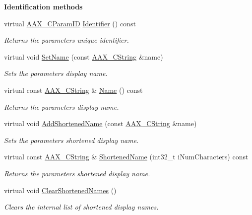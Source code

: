 \begin{Indent}{\bf Identification methods}\par
\begin{DoxyCompactItemize}
\item 
virtual \hyperlink{a00149_a1440c756fe5cb158b78193b2fc1780d1}{A\+A\+X\+\_\+\+C\+Param\+I\+D} \hyperlink{a00040_a446167294c50fd5761fcd41fa493f753}{Identifier} () const 
\begin{DoxyCompactList}\small\item\em Returns the parameter\textquotesingle{}s unique identifier. \end{DoxyCompactList}\item 
virtual void \hyperlink{a00040_a4d64be6c9e51840cde82e0521c98a8ac}{Set\+Name} (const \hyperlink{a00042}{A\+A\+X\+\_\+\+C\+String} \&name)
\begin{DoxyCompactList}\small\item\em Sets the parameter\textquotesingle{}s display name. \end{DoxyCompactList}\item 
virtual const \hyperlink{a00042}{A\+A\+X\+\_\+\+C\+String} \& \hyperlink{a00040_a497700bc60fbd19ad3651f9adfc30166}{Name} () const 
\begin{DoxyCompactList}\small\item\em Returns the parameter\textquotesingle{}s display name. \end{DoxyCompactList}\item 
virtual void \hyperlink{a00040_a1a23881e50534a7ec0634784b2af96a6}{Add\+Shortened\+Name} (const \hyperlink{a00042}{A\+A\+X\+\_\+\+C\+String} \&name)
\begin{DoxyCompactList}\small\item\em Sets the parameter\textquotesingle{}s shortened display name. \end{DoxyCompactList}\item 
virtual const \hyperlink{a00042}{A\+A\+X\+\_\+\+C\+String} \& \hyperlink{a00040_a718c18af4d690a8a23a6893635f9aacc}{Shortened\+Name} (int32\+\_\+t i\+Num\+Characters) const 
\begin{DoxyCompactList}\small\item\em Returns the parameter\textquotesingle{}s shortened display name. \end{DoxyCompactList}\item 
virtual void \hyperlink{a00040_a2a1560a8a5f5216a167eeab7158353b4}{Clear\+Shortened\+Names} ()
\begin{DoxyCompactList}\small\item\em Clears the internal list of shortened display names. \end{DoxyCompactList}\end{DoxyCompactItemize}
\end{Indent}
